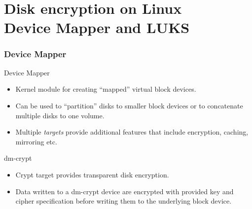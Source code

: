 \documentclass{beamer}
\begin{document}

\section{Disk encryption on Linux \\ \small Device Mapper and LUKS}

\begin{frame}
	\frametitle{Device Mapper}

	\begin{block}{Device Mapper}
		\begin{itemize}
			\item Kernel module for creating ``mapped'' virtual block devices.
			\item Can be used to ``partition'' disks to smaller block devices or to concatenate multiple disks to one volume.
			\item Multiple \emph{targets} provide additional features that include encryption, caching, mirroring etc.
		\end{itemize}
	\end{block}
	
	\begin{block}{dm-crypt}
		\begin{itemize}
			\item Crypt target provides transparent disk encryption.
			\item Data written to a dm-crypt device are encrypted with provided key and cipher specification before writing them to the underlying block device.
		\end{itemize}
	\end{block}

\end{frame}
\end{document}
